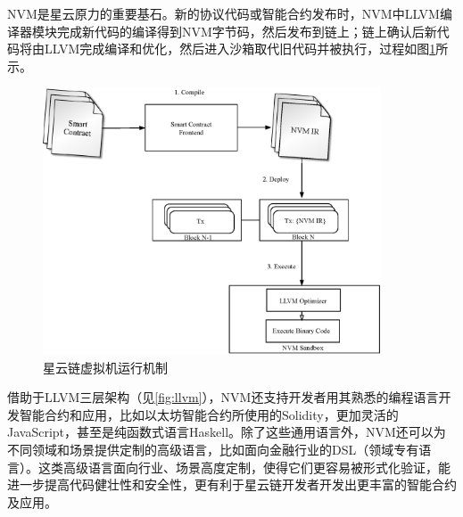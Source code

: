 NVM是星云原力的重要基石。新的协议代码或智能合约发布时，NVM中LLVM编译器模块完成新代码的编译得到NVM字节码，然后发布到链上；链上确认后新代码将由LLVM完成编译和优化，然后进入沙箱取代旧代码并被执行，过程如图\ref{fig:nvm-process}所示。 \\

\begin{figure}[h]
\centering
\includegraphics[width=10cm]{./figs/nvm-process}
\caption{星云链虚拟机运行机制}
\label{fig:nvm-process}
\end{figure}

借助于LLVM三层架构（见\ref{fig:llvm}），NVM还支持开发者用其熟悉的编程语言开发智能合约和应用，比如以太坊智能合约所使用的Solidity，更加灵活的JavaScript，甚至是纯函数式语言Haskell。除了这些通用语言外，NVM还可以为不同领域和场景提供定制的高级语言，比如面向金融行业的DSL（领域专有语言）。这类高级语言面向行业、场景高度定制，使得它们更容易被形式化验证，能进一步提高代码健壮性和安全性，更有利于星云链开发者开发出更丰富的智能合约及应用。
